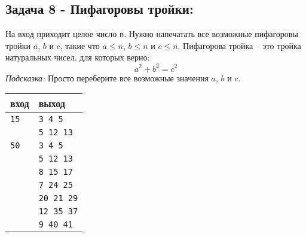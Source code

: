 \documentclass{article}
\begin{document}
\subsection*{Задача 8 - Пифагоровы тройки:}
На вход приходит целое число \texttt{n}. Нужно напечатать все возможные пифагоровы тройки $a$, $b$ и $c$, такие что $a \le n$, $b \le n$ и $c \le n$. Пифагорова тройка -- это тройка натуральных чисел, для которых верно:
$$
a^2 + b^2 = c^2
$$
\textit{Подсказка:} Просто переберите все возможные значения $a$, $b$ и $c$.

\begin{center}
\begin{tabular}{ l l }
 вход & выход \\ \hline
 \texttt{15}  & \texttt{3 4 5}  \\ 
              & \texttt{5 12 13}  \\ 
 \texttt{50}  & \texttt{3 4 5}  \\
              & \texttt{5 12 13}  \\ 
              & \texttt{8 15 17}  \\ 
              & \texttt{7 24 25}  \\ 
              & \texttt{20 21 29}  \\ 
              & \texttt{12 35 37}  \\ 
              & \texttt{9 40 41} 
\end{tabular}
\end{center}
\end{document}

